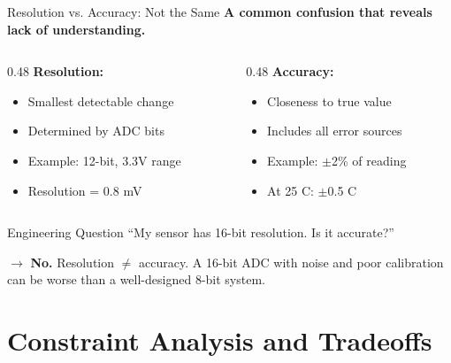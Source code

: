 \documentclass[aspectratio=169,11pt]{beamer}
\begin{document}
\begin{frame}{Resolution vs. Accuracy: Not the Same}
    \textbf{A common confusion that reveals lack of understanding.}
    
    \vspace{0.3cm}
    \begin{columns}[T]
        \begin{column}{0.48\textwidth}
            \textbf{Resolution:}
            \begin{itemize}
                \item Smallest detectable change
                \item Determined by ADC bits
                \item Example: 12-bit, 3.3V range
                \item Resolution = 0.8 mV
            \end{itemize}
        \end{column}
        \begin{column}{0.48\textwidth}
            \textbf{Accuracy:}
            \begin{itemize}
                \item Closeness to true value
                \item Includes all error sources
                \item Example: $\pm$2\% of reading
                \item At 25 C: $\pm$0.5 C
            \end{itemize}
        \end{column}
    \end{columns}
    
    \vspace{0.3cm}
    \begin{alertblock}{Engineering Question}
        ``My sensor has 16-bit resolution. Is it accurate?''
        
        $\rightarrow$ \textbf{No.} Resolution $\neq$ accuracy. A 16-bit ADC with noise and poor calibration can be worse than a well-designed 8-bit system.
    \end{alertblock}
\end{frame}

\section{Constraint Analysis and Tradeoffs}
\end{document}
